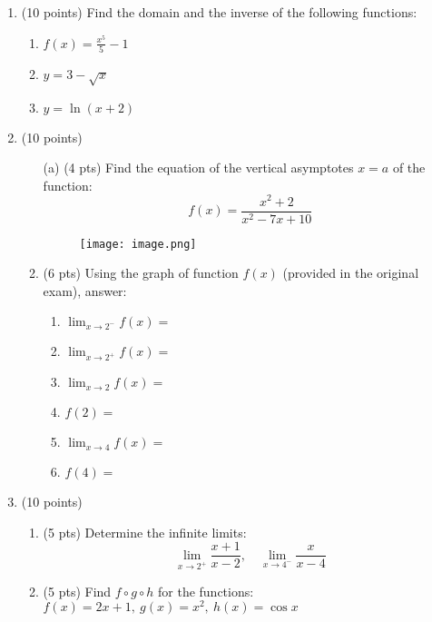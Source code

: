 \documentclass[12pt]{article}
\begin{document}
\vspace{1cm}

\begin{enumerate}
    \item (10 points) Find the domain and the inverse of the following functions:
    \begin{enumerate}
        \item \( f(x) = \frac{x^5}{5} - 1 \)
        \item \( y = 3 - \sqrt{x} \)
        \item \( y = \ln(x + 2) \)
    \end{enumerate}

\item (10 points)
\begin{enumerate}
    \item[(a)] (4 pts) Find the equation of the vertical asymptotes \(x = a\) of the function:  
    \[
    f(x) = \frac{x^2 + 2}{x^2 - 7x + 10}
    \]
    \begin{figure}[ht!]
        \centering
        \texttt{[image: image.png]}
    \end{figure}

        \item (6 pts) Using the graph of function \( f(x) \) (provided in the original exam), answer:
        \begin{enumerate}
            \item \( \lim_{x \to 2^-} f(x) = \)
            \item \( \lim_{x \to 2^+} f(x) = \)
            \item \( \lim_{x \to 2} f(x) = \)
            \item \( f(2) = \)
            \item \( \lim_{x \to 4} f(x) = \)
            \item \( f(4) = \)
        \end{enumerate}
    \end{enumerate}

    \item (10 points)
    \begin{enumerate}
        \item (5 pts) Determine the infinite limits:
        \[
        \lim_{x \to 2^+} \frac{x + 1}{x - 2}, \quad 
        \lim_{x \to 4^-} \frac{x}{x - 4}
        \]

        \item (5 pts) Find \( f \circ g \circ h \) for the functions: \\
        \( f(x) = 2x + 1,\ g(x) = x^2,\ h(x) = \cos x \)
    \end{enumerate}


\end{enumerate}
\end{document}
